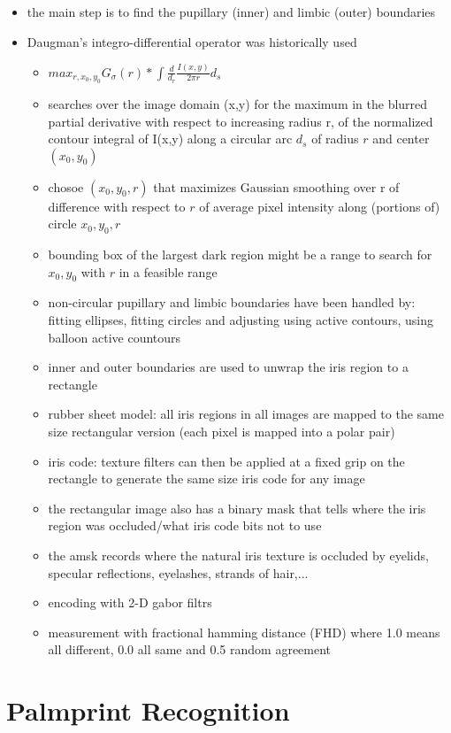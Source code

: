 \documentclass[paper=a4, fontsize=11pt]{scrartcl} %
\numberwithin{equation}{section} %
\numberwithin{figure}{section} %
\numberwithin{table}{section} %
\begin{document}
\begin{itemize}
\item the main step is to find the pupillary (inner) and limbic (outer) boundaries
\item Daugman's integro-differential operator was historically used
\begin{itemize}
\item $max_{r,x_0,y_0} G_\sigma(r) * \int{\frac{d}{d_r}}\frac{I(x,y)}{2\pi r}d_s$
\item searches over the image domain (x,y) for the maximum in the blurred partial derivative with respect to increasing radius r, of the normalized contour integral of I(x,y) along a circular arc $d_s$ of radius $r$ and center $(x_0,y_0)$
\item chosoe $(x_0,y_0,r)$ that maximizes Gaussian smoothing over r of difference with respect to $r$ of average pixel intensity along (portions of) circle $x_0,y_0,r$
\item bounding box of the largest dark region might be a range to search for $x_0,y_0$ with $r$ in a feasible range
\item non-circular pupillary and limbic boundaries have been handled by: fitting ellipses, fitting circles and adjusting using active contours, using balloon active countours
\item inner and outer boundaries are used to unwrap the iris region to a rectangle
\item rubber sheet model: all iris regions in all images are mapped to the same size rectangular version (each pixel is mapped into a polar pair)
\item iris code: texture filters can then be applied at a fixed grip on the rectangle to generate the same size iris code for any image
\item the rectangular image also has a binary mask that tells where the iris region was occluded/what iris code bits not to use
\item the amsk records where the natural iris texture is occluded by eyelids, specular reflections, eyelashes, strands of hair,...
\item encoding with 2-D gabor filtrs
\item measurement with fractional hamming distance (FHD) where 1.0 means all different, 0.0 all same and 0.5 random agreement
\end{itemize}
\end{itemize}

\section{Palmprint Recognition}
\end{document}
